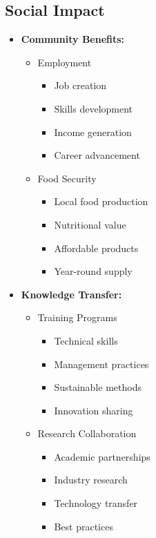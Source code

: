 \subsection{Social Impact}
\begin{itemize}
    \item \textbf{Community Benefits:}
    \begin{itemize}
        \item Employment
        \begin{itemize}
            \item Job creation
            \item Skills development
            \item Income generation
            \item Career advancement
        \end{itemize}
        
        \item Food Security
        \begin{itemize}
            \item Local food production
            \item Nutritional value
            \item Affordable products
            \item Year-round supply
        \end{itemize}
    \end{itemize}
    
    \item \textbf{Knowledge Transfer:}
    \begin{itemize}
        \item Training Programs
        \begin{itemize}
            \item Technical skills
            \item Management practices
            \item Sustainable methods
            \item Innovation sharing
        \end{itemize}
        
        \item Research Collaboration
        \begin{itemize}
            \item Academic partnerships
            \item Industry research
            \item Technology transfer
            \item Best practices
        \end{itemize}
    \end{itemize}
\end{itemize}

